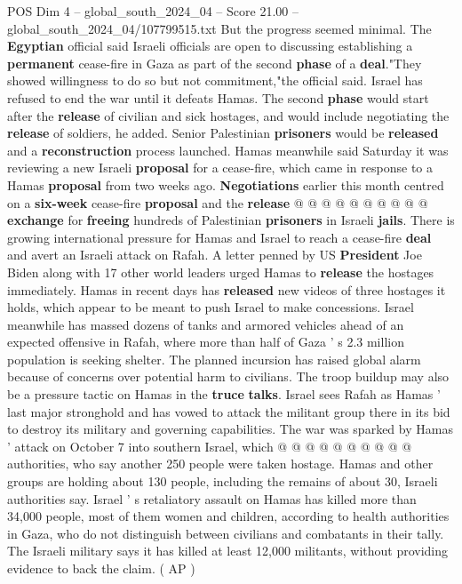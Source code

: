 \begin{textsample}{POS Dim 4 – global\_south\_2024\_04 – Score 21.00 – global\_south\_2024\_04/107799515.txt}
But the progress seemed minimal.
The \textbf{Egyptian} official said Israeli officials are open to discussing establishing a \textbf{permanent} cease-fire in Gaza as part of the second \textbf{phase} of a \textbf{deal}."They showed willingness to do so but not commitment,"the official said.
Israel has refused to end the war until it defeats Hamas.
The second \textbf{phase} would start after the \textbf{release} of civilian and sick hostages, and would include negotiating the \textbf{release} of soldiers, he added.
Senior Palestinian \textbf{prisoners} would be \textbf{released} and a \textbf{reconstruction} process launched.
Hamas meanwhile said Saturday it was reviewing a new Israeli \textbf{proposal} for a cease-fire, which came in response to a Hamas \textbf{proposal} from two weeks ago. \textbf{Negotiations} earlier this month centred on a \textbf{six-week} cease-fire \textbf{proposal} and the \textbf{release} @ @ @ @ @ @ @ @ @ @ \textbf{exchange} for \textbf{freeing} hundreds of Palestinian \textbf{prisoners} in Israeli \textbf{jails}.
There is growing international pressure for Hamas and Israel to reach a cease-fire \textbf{deal} and avert an Israeli attack on Rafah.
A letter penned by US \textbf{President} Joe Biden along with 17 other world leaders urged Hamas to \textbf{release} the hostages immediately.
Hamas in recent days has \textbf{released} new videos of three hostages it holds, which appear to be meant to push Israel to make concessions.
Israel meanwhile has massed dozens of tanks and armored vehicles ahead of an expected offensive in Rafah, where more than half of Gaza ' s 2.3 million population is seeking shelter.
The planned incursion has raised global alarm because of concerns over potential harm to civilians.
The troop buildup may also be a pressure tactic on Hamas in the \textbf{truce} \textbf{talks}.
Israel sees Rafah as Hamas ' last major stronghold and has vowed to attack the militant group there in its bid to destroy its military and governing capabilities.
The war was sparked by Hamas ' attack on October 7 into southern Israel, which @ @ @ @ @ @ @ @ @ @ authorities, who say another 250 people were taken hostage.
Hamas and other groups are holding about 130 people, including the remains of about 30, Israeli authorities say.
Israel ' s retaliatory assault on Hamas has killed more than 34,000 people, most of them women and children, according to health authorities in Gaza, who do not distinguish between civilians and combatants in their tally.
The Israeli military says it has killed at least 12,000 militants, without providing evidence to back the claim. ( AP )

\end{textsample}
